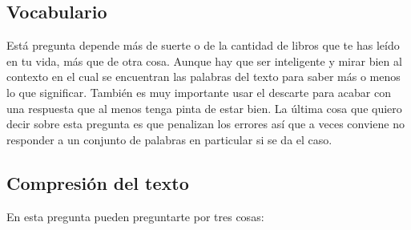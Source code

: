 \documentclass[arial,a4paper,print]{article}
\begin{document}
\subsection{Vocabulario}
Está pregunta depende más de suerte o de la cantidad de libros que te has leído en tu vida, más que de otra cosa. Aunque hay que ser inteligente y mirar bien al contexto en el cual se encuentran las palabras del texto para saber más o menos lo que significar. También es muy importante usar el descarte para acabar con una respuesta que al menos tenga pinta de estar bien. La última cosa que quiero decir sobre esta pregunta es que penalizan los errores así que a veces conviene no responder a un conjunto de palabras en particular si se da el caso. 

\pagebreak

\subsection{Compresión del texto}
En esta pregunta pueden preguntarte por tres cosas:
\end{document}
